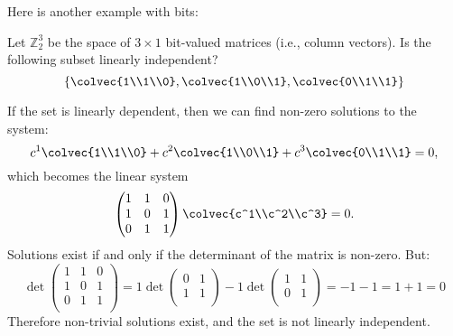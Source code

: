 Here is another example with bits:

\begin{example}
Let $\mathbb{Z}_2^3$ be the space of $3\times 1$ bit-valued matrices (i.e., column vectors).  Is the following subset linearly independent?
\[
\left\{ \colvec{1\\1\\0}, \colvec{1\\0\\1}, 
\colvec{0\\1\\1} \right\}
\]

If the set is linearly dependent, then we can find non-zero solutions to the system:
\[
c^1\colvec{1\\1\\0}+ c^2 \colvec{1\\0\\1} 
+c^3 \colvec{0\\1\\1}=0,
\]
which becomes the linear system
\[
\begin{pmatrix}
1 & 1 & 0 \\
1 & 0 & 1 \\
0 & 1 & 1 \\
\end{pmatrix}\colvec{c^1\\c^2\\c^3}=0.
\]
Solutions exist if and only if the determinant of the matrix is non-zero.  But:
\[
\det \begin{pmatrix}
1 & 1 & 0 \\
1 & 0 & 1 \\
0 & 1 & 1 \\
\end{pmatrix} = 1 \det \begin{pmatrix}
0 & 1 \\
1 & 1 \\
\end{pmatrix} -1 \det \begin{pmatrix}
1 & 1 \\
0 & 1 \\
\end{pmatrix} = -1-1=1+1=0
\]
Therefore non-trivial solutions exist, and the set is not linearly independent.

\end{example}




